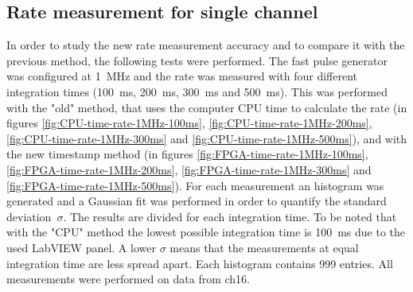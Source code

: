 \subsection{Rate measurement for single channel}\label{RateMeasurements2}
\noindent In order to study the new rate measurement accuracy and to compare it with the previous method, the following tests were performed.
The fast pulse generator was configured at 1~MHz and the rate was measured with four different integration times (100~ms, 200~ms, 300~ms and 500~ms). This was performed with the "old" method, that uses the computer CPU time to calculate the rate (in figures \ref{fig:CPU-time-rate-1MHz-100ms}, \ref{fig:CPU-time-rate-1MHz-200ms}, \ref{fig:CPU-time-rate-1MHz-300ms} and \ref{fig:CPU-time-rate-1MHz-500ms}), and with the new timestamp method (in figures \ref{fig:FPGA-time-rate-1MHz-100ms}, \ref{fig:FPGA-time-rate-1MHz-200ms}, \ref{fig:FPGA-time-rate-1MHz-300ms} and \ref{fig:FPGA-time-rate-1MHz-500ms}). For each measurement an histogram was generated and a Gaussian fit was performed in order to quantify the standard deviation~$\sigma$. 
The results are divided for each integration time.
To be noted that with the "CPU" method the lowest possible integration time is 100~ms due to the used LabVIEW panel.
A lower $\sigma$ means that the measurements at equal integration time are less spread apart.
Each histogram contains 999 entries.
All measurements were performed on data from ch16.

